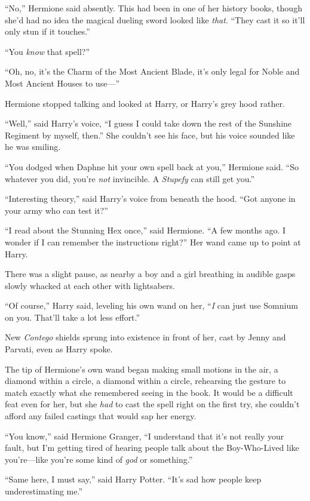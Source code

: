 “No,” Hermione said absently. This had been in one of her history books, though she’d had no idea the magical dueling sword looked like \emph{that}. “They cast it so it’ll only stun if it touches.”

“You \emph{know} that spell?”

“Oh, no, it’s the Charm of the Most Ancient Blade, it’s only legal for Noble and Most Ancient Houses to use—”

Hermione stopped talking and looked at Harry, or Harry’s grey hood rather.

“Well,” said Harry’s voice, “I guess I could take down the rest of the Sunshine Regiment by myself, then.” She couldn’t see his face, but his voice sounded like he was smiling.

“You dodged when Daphne hit your own spell back at you,” Hermione said. “So whatever you did, you’re \emph{not} invincible. A \emph{Stupefy} can still get you.”

“Interesting theory,” said Harry’s voice from beneath the hood. “Got anyone in your army who can test it?”

“I read about the Stunning Hex once,” said Hermione. “A few months ago. I wonder if I can remember the instructions right?” Her wand came up to point at Harry.

There was a slight pause, as nearby a boy and a girl breathing in audible gasps slowly whacked at each other with lightsabers.

“Of course,” Harry said, leveling his own wand on her, “\emph{I} can just use Somnium on you. That’ll take a lot less effort.”

New \emph{Contego} shields sprung into existence in front of her, cast by Jenny and Parvati, even as Harry spoke.

The tip of Hermione’s own wand began making small motions in the air, a diamond within a circle, a diamond within a circle, rehearsing the gesture to match exactly what she remembered seeing in the book. It would be a difficult feat even for her, but she \emph{had} to cast the spell right on the first try, she couldn’t afford any failed castings that would sap her energy.

“You know,” said Hermione Granger, “I understand that it’s not really your fault, but I’m getting tired of hearing people talk about the Boy-Who-Lived like you’re—like you’re some kind of \emph{god} or something.”

“Same here, I must say,” said Harry Potter. “It’s sad how people keep underestimating me.”

